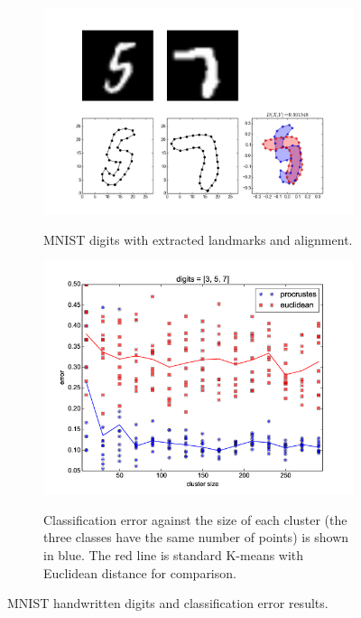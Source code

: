 \documentclass[simplex.tex]{subfiles}
\begin{document}
\begin{figure}[h!]
\begin{cframed}
\centering
\begin{subfigure}[t]{0.45\textwidth}
\includegraphics[width=\textwidth]{../../figs/nonpar57.png}
\label{fig:nonpar57}
\caption{
  MNIST digits with extracted landmarks and alignment.
  }
\end{subfigure}
\begin{subfigure}[t]{0.45\textwidth}
\includegraphics[width=\textwidth]{../../figs/nonPar357.png}
\label{fig:nonpar357}
\caption{
Classification error against the size of each
cluster (the three classes have the same number of points) is
shown in blue. The red line is standard
K-means with Euclidean distance for comparison.}
\end{subfigure}
\caption{
  MNIST handwritten digits and classification error results.
}
\label{fig:nonpar}
\end{cframed}
\end{figure}
\clearpage
\end{document}
